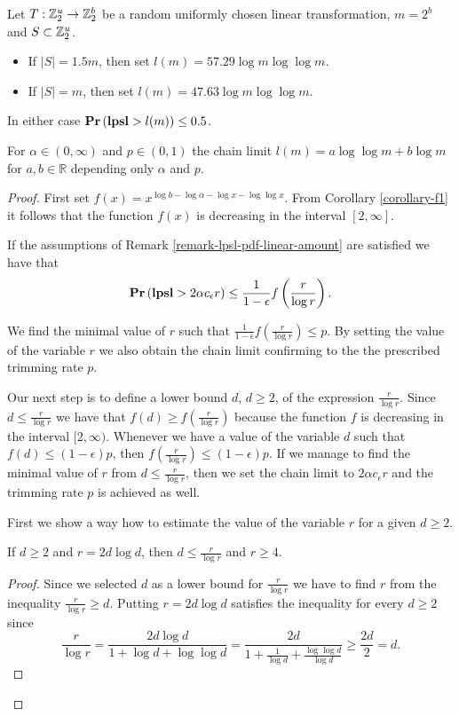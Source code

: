 \begin{theorem}
\label{theorem-model-chain-limit-rule}
Let $T: \mathbb{Z}_{2}^{u} \rightarrow \mathbb{Z}_{2}^{b}$ be a random uniformly chosen linear transformation, $m = 2 ^ b$ and $S \subset \mathbb{Z}_{2}^{u}$.
\begin{itemize}
\item If $|S| = 1.5 m$, then set $l(m) = 57.29 \log m \log \log m$.
\item If $|S| = m$, then set $l(m) = 47.63 \log m \log \log m$.
\end{itemize}
In either case $\mathbf{Pr}\left(\mathbf{lpsl} > l(m)\right) \leq 0.5$.

For $\alpha \in (0, \infty)$ and $p \in (0, 1)$ the chain limit $l(m) = a \log \log m + b \log m$ for $a, b \in \mathbb{R}$ depending only $\alpha$ and $p$.
\end{theorem}
\begin{proof}
First set $f(x) = x ^ {\log b - \log \alpha - \log x - \log \log x}$. From Corollary \ref{corollary-f1} it follows that the function $f(x)$ is decreasing in the interval $\left[2, \infty \right]$.

If the assumptions of Remark \ref{remark-lpsl-pdf-linear-amount} are satisfied we have that 
\[
	\mathbf{Pr}\left(\mathbf{lpsl} > 2 \alpha c_\epsilon r\right) \leq \frac{1}{1 - \epsilon} f\left(\frac{r}{\log r}\right) \text{.}
\]

We find the minimal value of $r$ such that $\frac{1}{1 - \epsilon} f\left(\frac{r}{\log r}\right) \leq p$. By setting the value of the variable $r$ we also obtain the chain limit confirming to the the prescribed trimming rate $p$. 

Our next step is to define a lower bound $d$, $d \geq 2$, of the expression $\frac{r}{\log r}$. Since $d \leq \frac{r}{\log r}$ we have that $f(d) \geq f\left(\frac{r}{\log r}\right)$ because the function $f$ is decreasing in the interval $[2, \infty)$. Whenever we have a value of the variable $d$ such that $f(d) \leq (1 - \epsilon) p$, then $f\left(\frac{r}{\log r}\right) \leq (1- \epsilon) p$. If we manage to find the minimal value of $r$ from $d \leq \frac{r}{\log r}$, then we set the chain limit to $2 \alpha c_\epsilon r$ and the trimming rate $p$ is achieved as well. 

First we show a way how to estimate the value of the variable $r$ for a given $d \geq 2$. 
\begin{claim}
\label{claim-choose-r}
If $d \geq 2$ and $r = 2d \log d$, then $d \leq \frac{r}{\log r}$ and $r \geq 4$.
\end{claim}
\begin{proof}
Since we selected $d$ as a lower bound for $\frac{r}{\log r}$ we have to find $r$ from the inequality $\frac{r}{\log r} \geq d$. Putting $r = 2 d \log d$ satisfies the inequality for every $d \geq 2$ since
\[
\frac{r}{\log r} = \frac{2 d \log d}{1 + \log d + \log \log d} = \frac{2 d}{1 + \frac{1}{\log d} + \frac{\log \log d}{\log d}} \geq \frac{2d}{2} = d \text{.}
\]


\end{proof}
\end{proof}
